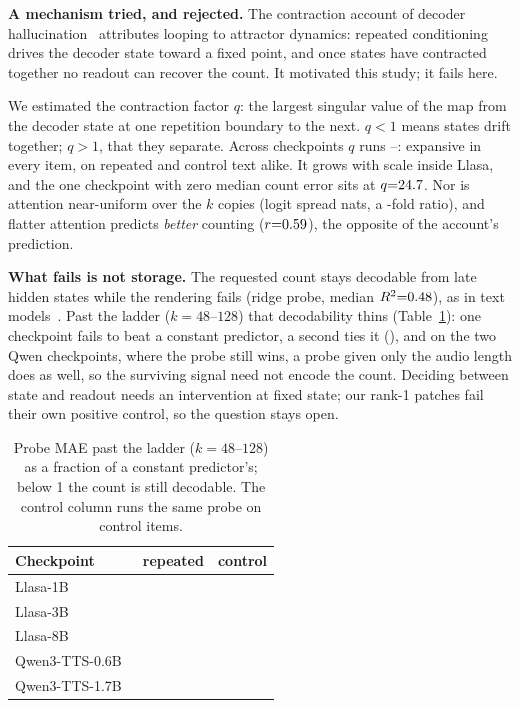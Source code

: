 \documentclass{article}
\newcommand{\tabsize}{\small}
\begin{document}
\textbf{A mechanism tried, and rejected.}
The contraction account of decoder
hallucination~\cite{viakhirev2026dispersion} attributes looping to
attractor dynamics: repeated conditioning drives the decoder state toward a
fixed point, and once states have contracted together no readout can
recover the count. It motivated this study; it fails here.

We estimated the contraction factor $q$: the largest singular value of
the map from the decoder state at one repetition boundary to the next.
$q<1$ means states drift together; $q>1$, that they separate. Across \JacPanelN{} checkpoints $q$ runs \JacQMin{}--\JacQMax{}:
expansive in every item, on repeated and control text alike. It grows with
scale inside Llasa, and the one checkpoint with zero median count error
sits at $q{=}24.7{}$. Nor is attention near-uniform over the $k$ copies (logit spread
\DeltaMax{} nats, a \DeltaRatio{}-fold ratio), and flatter attention
predicts \emph{better} counting ($r{=}0.59{}$), the opposite of the
account's prediction.

\textbf{What fails is not storage.}
The requested count stays decodable from late hidden states while the
rendering fails (ridge probe, median $R^2{=}0.48{}$), as in text
models~\cite{venkatesh2026repeated}. Past the ladder ($k{=}48$--$128$) that decodability thins
(Table~\ref{tab:probe}): one checkpoint fails to beat a constant
predictor, a second ties it (\PhRepLlasaThreeB{}), and on the two Qwen
checkpoints, where the probe still wins, a probe given only the audio
length does as well, so the surviving signal need not encode the count. Deciding between state and readout needs an intervention at
fixed state; our rank-1 patches fail their own positive control, so the
question stays open.

\begin{table}[t]
\centering
\caption{Probe MAE past the ladder ($k{=}48$--$128$) as a fraction of a
constant predictor's; below 1 the count is still decodable. The control
column runs the same probe on control items.}
\label{tab:probe}
{\tabsize\setlength{\tabcolsep}{6pt}
\begin{tabular}{lrr}
\toprule
Checkpoint & repeated & control \\
\midrule
Llasa-1B~\cite{ye2025llasa} & \PhRepLlasaOneB{} & \PhCtlLlasaOneB{} \\
Llasa-3B~\cite{ye2025llasa} & \PhRepLlasaThreeB{} & \PhCtlLlasaThreeB{} \\
Llasa-8B~\cite{ye2025llasa} & \PhRepLlasaEightB{} & \PhCtlLlasaEightB{} \\
Qwen3-TTS-0.6B~\cite{hu2026qwen3tts} & \PhRepQwenZeroSixB{} & \PhCtlQwenZeroSixB{} \\
Qwen3-TTS-1.7B~\cite{hu2026qwen3tts} & \PhRepQwenOneSevenB{} & \PhCtlQwenOneSevenB{} \\
\bottomrule
\end{tabular}}
\end{table}
\end{document}
